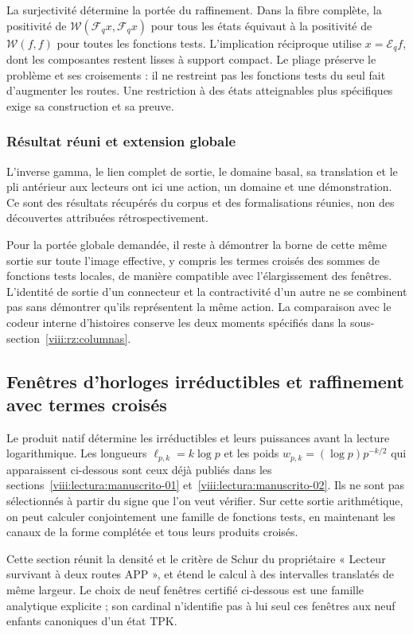 La surjectivité détermine la portée du raffinement. Dans la fibre complète, la positivité de \(\mathscr W(\mathcal F_qx,\mathcal F_qx)\) pour tous les états équivaut à la positivité de \(\mathscr W(f,f)\) pour toutes les fonctions tests. L’implication réciproque utilise \(x=\mathcal E_qf\), dont les composantes restent lisses à support compact. Le pliage préserve le problème et ses croisements : il ne restreint pas les fonctions tests du seul fait d’augmenter les routes. Une restriction à des états atteignables plus spécifiques exige sa construction et sa preuve.

\subsubsection*{Résultat réuni et extension globale}
L’inverse gamma, le lien complet de sortie, le domaine basal, sa translation et le pli antérieur aux lecteurs ont ici une action, un domaine et une démonstration. Ce sont des résultats récupérés du corpus et des formalisations réunies, non des découvertes attribuées rétrospectivement.

Pour la portée globale demandée, il reste à démontrer la borne de cette même sortie sur toute l'image effective, y compris les termes croisés des sommes de fonctions tests locales, de manière compatible avec l'élargissement des fenêtres. L'identité de sortie d'un connecteur et la contractivité d'un autre ne se combinent pas sans démontrer qu'ils représentent la même action. La comparaison avec le codeur interne d'histoires conserve les deux moments spécifiés dans la sous-section~\ref{viii:rz:columnas}.

\subsection{Fenêtres d’horloges irréductibles et raffinement avec termes croisés}
\label{viii:rz:ventanas}
Le produit natif détermine les irréductibles et leurs puissances avant la lecture logarithmique. Les longueurs \(\ell_{p,k}=k\log p\) et les poids \(w_{p,k}=(\log p)p^{-k/2}\) qui apparaissent ci-dessous sont ceux déjà publiés dans les sections~\ref{viii:lectura:manuscrito-01} et~\ref{viii:lectura:manuscrito-02}. Ils ne sont pas sélectionnés à partir du signe que l’on veut vérifier. Sur cette sortie arithmétique, on peut calculer conjointement une famille de fonctions tests, en maintenant les canaux de la forme complétée et tous leurs produits croisés.

Cette section réunit la densité et le critère de Schur du propriétaire « Lecteur survivant à deux routes APP », et étend le calcul à des intervalles translatés de même largeur. Le choix de neuf fenêtres certifié ci-dessous est une famille analytique explicite ; son cardinal n’identifie pas à lui seul ces fenêtres aux neuf enfants canoniques d’un état TPK.

